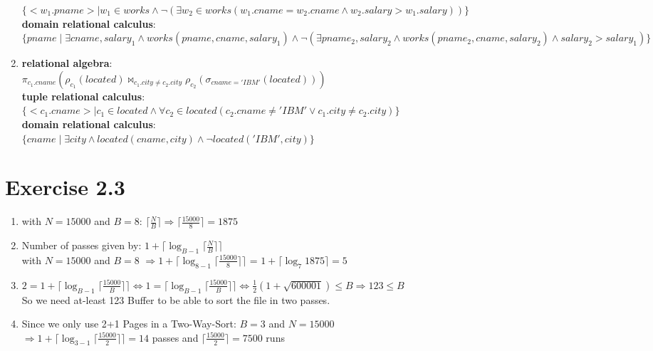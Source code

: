 \documentclass[12pt]{article}
\begin{document}
\begin{enumerate}[label = 2.2.\arabic*]
			$\{ <w_1.pname> \mid w_1 \in works \land \lnot(\exists w_2 \in works(w_1.cname = w_2.cname \land w_2.salary > w_1.salary ))\} $ \\
			\textbf{domain relational calculus}:\\
			$\{ pname \mid \exists cname, salary_1 \land works(pname,cname,salary_1) \land \lnot(\exists pname_2, salary_2 \land works(pname_2,cname,salary_2) \land salary_2 > salary_1  )\} $ \\
		\item 
			\textbf{relational algebra}:\\
			$\pi_{c_1.cname}( \rho_{c_1}(located) \bowtie_{c_1.city \neq c_2.city} \rho_{c_2}(\sigma_{cname='IBM'}(located)) ) $ \\
			\textbf{tuple relational calculus}:\\
			$\{ <c_1.cname> \mid c_1\in located \land \forall c_2\in located (c_2.cname \neq 'IBM' \lor c_1.city \neq c_2.city) \} $ \\
			\textbf{domain relational calculus}:\\
			$\{ cname \mid \exists city \land located(cname, city) \land \lnot located('IBM', city)\}$ \\
	\end{enumerate}

	\section{Exercise 2.3}
	\begin{enumerate}[label=2.3.\arabic*]
		\item with $N=15000$ and $B=8$: $\lceil \frac{N}{B} \rceil \Rightarrow \lceil \frac{15000}{8} \rceil = 1875$
		\item Number of passes given by: $1+\lceil \log_{B-1}\lceil \frac{N}{B} \rceil \rceil$\\
			  with $N=15000$ and $B=8$ $\Rightarrow 1+\lceil \log_{8-1}\lceil \frac{15000}{8} \rceil \rceil$ = $1+\lceil \log_7 1875 \rceil = 5 $
		\item $ 2 = 1+\lceil \log_{B-1}\lceil \frac{15000}{B} \rceil \rceil \Leftrightarrow 1 = \lceil \log_{B-1}\lceil \frac{15000}{B} \rceil \rceil \Leftrightarrow \frac{1}{2}(1+\sqrt{600001}) \le B \Rightarrow 123 \le B$ \\
		So we need at-least 123 Buffer to be able to sort the file in two passes. %
		\item Since we only use 2+1 Pages in a Two-Way-Sort: $B=3$ and $N=15000$ \\ $\Rightarrow 1+\lceil \log_{3-1}\lceil \frac{15000}{2} \rceil \rceil = 14$ passes 
			and $ \lceil \frac{15000}{2} \rceil = 7500$ runs
		
	\end{enumerate}
\end{document}
